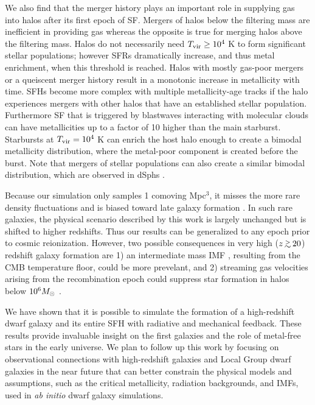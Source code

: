 \documentclass[apjl]{emulateapj}
\begin{document}
We also find that the merger history plays an important role in
supplying gas into halos after its first epoch of SF.  Mergers of
halos below the filtering mass are inefficient in providing gas
whereas the opposite is true for merging halos above the filtering
mass.  Halos do not necessarily need $\tvir \ge 10^4$ K to form
significant stellar populations; however SFRs dramatically increase,
and thus metal enrichment, when this threshold is reached.  Halos with
mostly gas-poor mergers or a queiscent merger history result in a
monotonic increase in metallicity with time.  SFHs become more complex
with multiple metallicity-age tracks if the halo experiences mergers
with other halos that have an established stellar population.
Furthermore SF that is triggered by blastwaves interacting with
molecular clouds can have metallicities up to a factor of 10 higher
than the main starburst.  Starbursts at $\tvir = 10^4$ K can enrich
the host halo enough to create a bimodal metallicity distribution,
where the metal-poor component is created before the burst.  Note that
mergers of stellar populations can also create a similar bimodal
distribution, which are observed in dSphs \cite{Battaglia11}.

Because our simulation only samples 1 comoving Mpc$^3$, it misses the
more rare density fluctuations and is biased toward late galaxy
formation \citep{Barkana04}.  In such rare galaxies, the physical
scenario described by this work is largely unchanged but is shifted to
higher redshifts.  Thus our results can be generalized to any epoch
prior to cosmic reionization.  However, two possible consequences in
very high ($z \gsim 20$) redshift galaxy formation are 1) an
intermediate mass IMF \citep{Larson98, Tumlinson07_IMF,
  2009ApJ...691..441S}, resulting from the CMB temperature floor,
could be more prevelant, and 2) streaming gas velocities arising from
the recombination epoch \citep{Tselia10} could suppress star formation
in halos below $10^6 \Ms$ \citep{Tselia10_Minihalo, Greif11_Delay}.

We have shown that it is possible to simulate the formation of a
high-redshift dwarf galaxy and its entire SFH with radiative and
mechanical feedback.  These results provide invaluable insight on the
first galaxies and the role of metal-free stars in the early universe.
We plan to follow up this work by focusing on observational
connections with high-redshift galaxies and Local Group dwarf galaxies
in the near future that can better constrain the physical models and
assumptions, such as the critical metallicity, radiation backgrounds,
and IMFs, used in \textit{ab initio} dwarf galaxy simulations.
\end{document}
